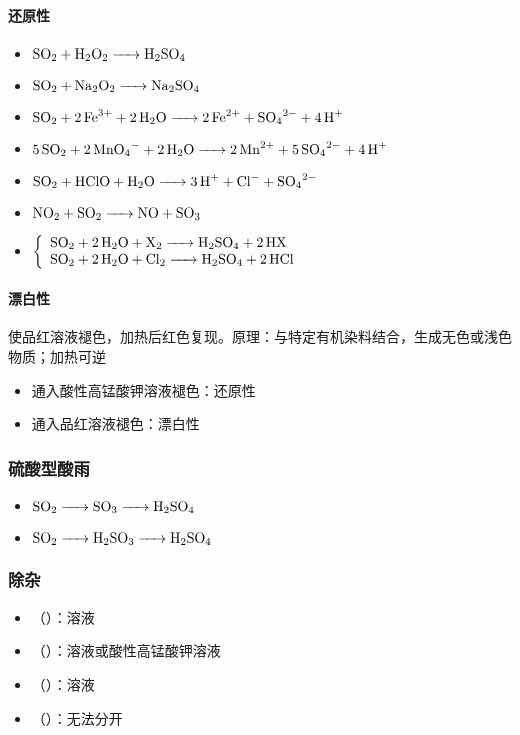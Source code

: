 \documentclass[a4paper]{article}
\begin{document}
	\paragraph{还原性}
	\begin{itemize}
		\item $\ce{SO2 + H2O2 -> H2SO4}$
		\item $\ce{SO2 + Na2O2 -> Na2SO4}$
		\item $\ce{SO2 + 2Fe^3+ + 2H2O -> 2Fe^2+ + SO4^2- + 4H+}$
		\item $\ce{5SO2 + 2MnO4- + 2H2O -> 2Mn^2+ + 5SO4^2- + 4H+}$
		\item $\ce{SO2 + HClO + H2O -> 3H+ + Cl- + SO4^2-}$
		\item $\ce{NO2 + SO2 -> NO + SO3}$
		\item $\left\{\begin{array}{lr}
				\ce{SO2 + 2H2O + X2 -> H2SO4 + 2HX}\\
				\ce{SO2 + 2H2O + Cl2 -> H2SO4 + 2HCl}\\
			\end{array}\right.$
	\end{itemize}
	\paragraph{漂白性}
	使\textcolor[rgb]{0.721,0.207,0.105}{品红溶液}褪色，加热后红色复现。原理：与特定有机染料结合，生成无色或浅色物质；加热可逆
	\begin{itemize}
		\item {}通入酸性高锰酸钾溶液褪色：还原性
		\item {}通入品红溶液褪色：漂白性
	\end{itemize}
	\subsubsection{硫酸型酸雨}
	\begin{itemize}
		\item $\ce{SO2 -> SO3 -> H2SO4}$
		\item $\ce{SO2 -> H2SO3 -> H2SO4}$
	\end{itemize}
	\subsubsection{除杂}
	\begin{itemize}
		\item {}（）：溶液
		\item {}（）：溶液或酸性高锰酸钾溶液
		\item {}（）：溶液
		\item {}（）：无法分开
	\end{itemize}
\end{document}
